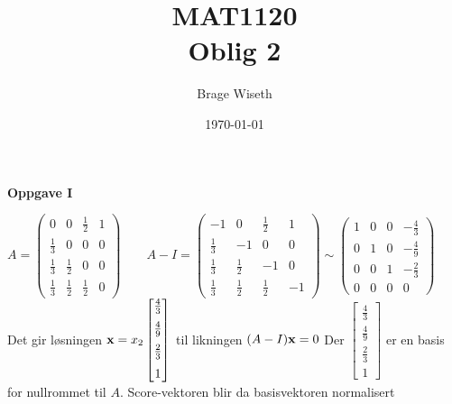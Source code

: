 \documentclass{article}%
\title{MAT1120\\Oblig 2}%
\author{Brage Wiseth}%
\date{\today}%
\begin{document}
%
\normalsize%
%
\maketitle%

\begin{tcolorbox}[colframe=white]
    \textbf{Oppgave I}
\end{tcolorbox}
$A =
\begin{pmatrix}
    0           &   0           &   \frac{1}{2} &   1\\[6pt]
    \frac{1}{3} &   0           &   0           &   0\\[6pt]
    \frac{1}{3} &   \frac{1}{2} &   0           &   0\\[6pt]
    \frac{1}{3} &   \frac{1}{2} &   \frac{1}{2} &   0
\end{pmatrix}
\qquad A - I = 
\begin{pmatrix}
    -1          &   0           &   \frac{1}{2} &   1\\[6pt]
    \frac{1}{3} &  -1           &   0           &   0\\[6pt]
    \frac{1}{3} &   \frac{1}{2} &  -1           &   0\\[6pt]
    \frac{1}{3} &   \frac{1}{2} &   \frac{1}{2} &  -1
\end{pmatrix}
\sim 
\begin{pmatrix}
    1    &   0  &   0   &   -\frac{4}{3}\\[6pt]
    0    &   1  &   0   &   -\frac{4}{9}\\[6pt]
    0    &   0  &   1   &   -\frac{2}{3}\\[6pt]
    0    &   0  &   0   &   0
\end{pmatrix}
$\vspace*{2mm}\\
Det gir løsningen $\vb x = x_2\begin{bmatrix}
    \frac{4}{3}\\[6pt] \frac{4}{9}\\[6pt] \frac{2}{3}\\[6pt] 1
\end{bmatrix} $
til likningen $(A-I)\vb x = 0$ Der $\begin{bmatrix}
    \frac{4}{3}\\[6pt] \frac{4}{9}\\[6pt] \frac{2}{3}\\[6pt] 1
\end{bmatrix} 
$ er en basis for nullrommet til $A$. Score-vektoren blir da basisvektoren normalisert
\end{document}
